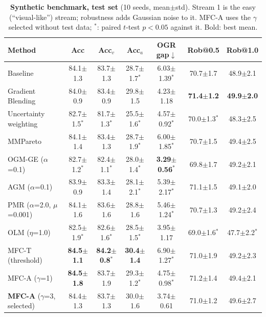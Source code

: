 \documentclass[fleqn,10pt]{wlscirep}
\newcommand{\pmm}{$\pm$} %
\begin{document}
\begin{table}[t]
\caption{\textbf{Synthetic benchmark, test set} (10 seeds, mean\pmm std). Stream 1 is the easy (``visual-like'') stream; robustness adds Gaussian noise to it. MFC-A uses the $\gamma$ selected without test data; $^{*}$: paired $t$-test $p<0.05$ against it. Bold: best mean.}
\label{tab:main_syn}
\centering
\footnotesize
\begin{tabular}{@{}lcccccc@{}}
\toprule
\textbf{Method} & \textbf{Acc} & \textbf{Acc$_v$} & \textbf{Acc$_a$} & \textbf{OGR gap}$\downarrow$ & \textbf{Rob@0.5} & \textbf{Rob@1.0} \\ \midrule
Baseline & 84.1$\pm$1.3 & 83.7$\pm$1.3 & 28.7$\pm$1.7$^{*}$ & 6.03$\pm$1.39$^{*}$ & 70.7$\pm$1.7 & 48.9$\pm$2.1 \\
Gradient Blending & 84.0$\pm$0.9 & 83.4$\pm$0.9 & 29.8$\pm$1.5 & 4.23$\pm$1.18 & \textbf{71.4$\pm$1.2} & \textbf{49.9$\pm$2.0} \\
Uncertainty weighting & 82.7$\pm$1.5$^{*}$ & 81.7$\pm$1.3$^{*}$ & 25.5$\pm$1.6$^{*}$ & 4.57$\pm$0.92$^{*}$ & 70.0$\pm$1.3$^{*}$ & 48.3$\pm$2.5 \\
MMPareto & 84.1$\pm$1.4 & 83.4$\pm$1.3 & 28.7$\pm$1.9$^{*}$ & 6.00$\pm$1.85$^{*}$ & 70.7$\pm$1.5 & 49.4$\pm$2.5 \\
OGM-GE ($\alpha$=0.1) & 82.7$\pm$1.2$^{*}$ & 82.4$\pm$1.1$^{*}$ & 28.0$\pm$1.4$^{*}$ & \textbf{3.29$\pm$0.56$^{*}$} & 69.8$\pm$1.7 & 49.2$\pm$2.1 \\
AGM ($\alpha$=0.1) & 83.9$\pm$0.9 & 83.3$\pm$1.4 & 28.1$\pm$2.1$^{*}$ & 5.39$\pm$2.17$^{*}$ & 71.1$\pm$1.5 & 49.1$\pm$2.0 \\
PMR ($\alpha$=2.0, $\mu$=0.001) & 84.1$\pm$1.6 & 83.6$\pm$1.6 & 28.8$\pm$1.6 & 5.46$\pm$1.24$^{*}$ & 70.7$\pm$1.3 & 49.2$\pm$2.4 \\
OLM ($\eta$=1.0) & 82.5$\pm$1.9$^{*}$ & 82.6$\pm$1.6$^{*}$ & 28.5$\pm$1.5$^{*}$ & 3.95$\pm$1.17 & 69.0$\pm$1.6$^{*}$ & 47.7$\pm$2.2$^{*}$ \\
MFC-T (threshold) & \textbf{84.5$\pm$1.1} & \textbf{84.2$\pm$0.8$^{*}$} & \textbf{30.4$\pm$1.4} & 6.90$\pm$1.27$^{*}$ & 71.0$\pm$1.9 & 49.2$\pm$2.3 \\
MFC-A ($\gamma$=1) & \textbf{84.5$\pm$1.8} & 83.7$\pm$1.9 & 29.3$\pm$1.2$^{*}$ & 4.75$\pm$0.98$^{*}$ & 71.2$\pm$1.4 & 49.4$\pm$2.1 \\
\textbf{MFC-A} ($\gamma$=3, selected) & 84.4$\pm$1.3 & 83.7$\pm$1.3 & 30.0$\pm$1.6 & 3.74$\pm$0.61 & 71.0$\pm$1.2 & 49.6$\pm$2.7 \\
\bottomrule
\end{tabular}
\end{table}
\end{document}
